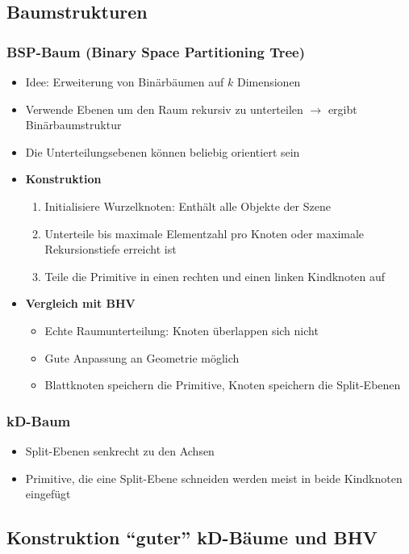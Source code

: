 \subsection{Baumstrukturen}

\subsubsection{BSP-Baum (Binary Space Partitioning Tree)}
\begin{itemize}
	\item Idee: Erweiterung von Binärbäumen auf \(k\) Dimensionen
	\item Verwende Ebenen um den Raum rekursiv zu unterteilen \(\rightarrow\) ergibt Binärbaumstruktur
	\item Die Unterteilungsebenen können beliebig orientiert sein
	\item \textbf{Konstruktion}
	\begin{enumerate}
		\item Initialisiere Wurzelknoten: Enthält alle Objekte der Szene
		\item Unterteile bis maximale Elementzahl pro Knoten oder maximale Rekursionstiefe erreicht ist
		\item Teile die Primitive in einen rechten und einen linken Kindknoten auf
	\end{enumerate}
	\item \textbf{Vergleich mit BHV}
	\begin{itemize}
		\item Echte Raumunterteilung: Knoten überlappen sich nicht
		\item Gute Anpassung an Geometrie möglich
		\item Blattknoten speichern die Primitive, Knoten speichern die Split-Ebenen
	\end{itemize}
\end{itemize}

\subsubsection{kD-Baum}
\begin{itemize}
	\item Split-Ebenen senkrecht zu den Achsen
	\item Primitive, die eine Split-Ebene schneiden werden meist in beide Kindknoten eingefügt
\end{itemize}


\subsection{Konstruktion "`guter"' kD-Bäume und BHV}

